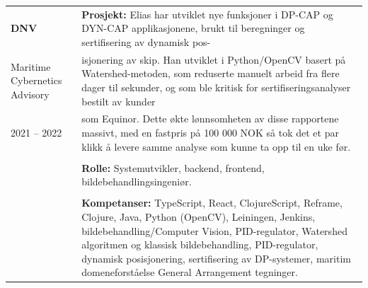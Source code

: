 \documentclass[a4paper,10pt]{article}
\begin{document}
\noindent
\begin{tabular}{@{}p{4cm}p{11cm}@{}}  %
\textbf{DNV} 
& \textbf{Prosjekt:} Elias har utviklet nye funksjoner i DP-CAP og DYN-CAP applikasjonene, brukt til beregninger og sertifisering av dynamisk pos-\\
Maritime Cybernetics Advisory & isjonering av skip. Han utviklet i Python/OpenCV basert på Watershed-metoden, som reduserte manuelt arbeid fra flere dager til sekunder, og som ble kritisk for sertifiseringsanalyser bestilt av kunder\\
2021 -- 2022 & som Equinor. Dette økte lønnsomheten av disse rapportene massivt, med en fastpris på 100 000 NOK så tok det et par klikk å levere samme analyse som kunne ta opp til en uke før. \\
& \\
& \textbf{Rolle:} Systemutvikler, backend, frontend, bildebehandlingsingeniør. \\
& \\
& \textbf{Kompetanser:} TypeScript, React, ClojureScript, Reframe, Clojure, Java, Python (OpenCV), Leiningen, Jenkins, bildebehandling/Computer Vision, PID-regulator, Watershed algoritmen og klassisk bildebehandling, PID-regulator, dynamisk posisjonering, sertifisering av DP-systemer, maritim domeneforståelse General Arrangement tegninger. \\
\end{tabular}
 


 
\end{document}
